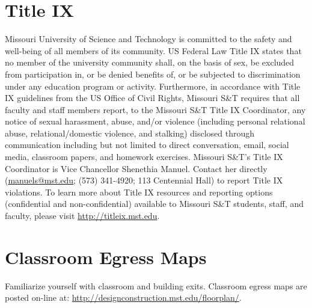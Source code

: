 \documentclass{article}
\begin{document}
\section{Title IX}
Missouri University of Science and Technology is committed to the safety and well-being of all members of its community.
US Federal Law Title IX states that no member of the university community shall, on the basis of sex, be excluded from participation in, or be denied benefits of, or be subjected to discrimination under any education program or activity.
Furthermore, in accordance with Title IX guidelines from the US Office of Civil Rights, Missouri S\&T requires that all faculty and staff members report, to the Missouri S\&T Title IX Coordinator, any notice of sexual harassment, abuse, and/or violence (including personal relational abuse, relational/domestic violence, and stalking) disclosed through communication including but not limited to direct conversation, email, social media, classroom papers, and homework exercises. Missouri S\&T’s Title IX Coordinator is Vice Chancellor Shenethia Manuel.
Contact her directly (\href{mailto:manuels@mst.edu}{manuels@mst.edu}; (573) 341-4920; 113 Centennial Hall) to report Title IX violations.
To learn more about Title IX resources and reporting options (confidential and non-confidential) available to Missouri S\&T students, staff, and faculty, please visit \href{http://titleix.mst.edu}{http://titleix.mst.edu}.

\section{Classroom Egress Maps}
Familiarize yourself with classroom and building exits. Classroom egress maps are posted on-line at: \href{http://designconstruction.mst.edu/floorplan/}{http://designconstruction.mst.edu/floorplan/}.
\end{document}
